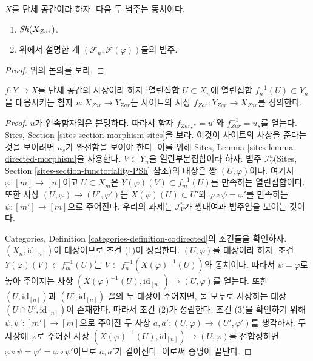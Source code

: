 \begin{lemma}
\label{lemma-describe-sheaves-simplicial-site}
$X$를 단체 공간이라 하자. 다음 두 범주는 동치이다.
\begin{enumerate}
\item $\mathop{\mathit{Sh}}\nolimits(X_{Zar})$.
\item 위에서 설명한 계 $(\mathcal{F}_n, \mathcal{F}(\varphi))$들의 범주.
\end{enumerate}
\end{lemma}


\begin{proof}
위의 논의를 보라.
\end{proof}

\begin{lemma}
\label{lemma-simplicial-space-site-functorial}
$f : Y \to X$를 단체 공간의 사상이라 하자.
열린집합 $U \subset X_n$에 열린집합
$f_n^{-1}(U) \subset Y_n$을 대응시키는 함자 $u : X_{Zar} \to Y_{Zar}$는
사이트의 사상 $f_{Zar} : Y_{Zar} \to X_{Zar}$를 정의한다.
\end{lemma}

\begin{proof}
$u$가 연속함자임은 분명하다. 따라서 함자
$f_{Zar, *} = u^s$와 $f_{Zar}^{-1} = u_s$를 얻는다.
Sites, Section \ref{sites-section-morphism-sites}을 보라.
이것이 사이트의 사상을 준다는 것을 보이려면 $u_s$가 완전함을
보여야 한다. 이를 위해 Sites, Lemma
\ref{sites-lemma-directed-morphism}을 사용한다.
$V \subset Y_n$을 열린부분집합이라 하자. 범주
$\mathcal{I}_V^u$(Sites, Section \ref{sites-section-functoriality-PSh} 참조)의
대상은 쌍 $(U, \varphi)$이다. 여기서
$\varphi : [m] \to [n]$이고 $U \subset X_m$은
$Y(\varphi)(V) \subset f_m^{-1}(U)$를 만족하는 열린집합이다.
또한 사상 $(U, \varphi) \to (U', \varphi')$는
$X(\psi)(U) \subset U'$와 $\varphi \circ \psi = \varphi'$를 만족하는
$\psi : [m'] \to [m]$으로 주어진다.
우리의 과제는 $\mathcal{I}_V^u$가 쌍대여과 범주임을 보이는 것이다.

\medskip\noindent
Categories, Definition \ref{categories-definition-codirected}의 조건들을
확인하자. $(X_n, \text{id}_{[n]})$이 대상이므로 조건 (1)이 성립한다.
$(U, \varphi)$를 대상이라 하자. 조건
$Y(\varphi)(V) \subset f_m^{-1}(U)$는
$V \subset f_n^{-1}(X(\varphi)^{-1}(U))$와 동치이다. 따라서
$\psi = \varphi$로 놓아 주어지는 사상
$(X(\varphi)^{-1}(U), \text{id}_{[n]}) \to (U, \varphi)$를 얻는다.
또한 $(U, \text{id}_{[n]})$과 $(U', \text{id}_{[n]})$ 꼴의
두 대상이 주어지면, 둘 모두로 사상하는 대상
$(U \cap U', \text{id}_{[n]})$이 존재한다. 따라서 조건 (2)가 성립한다.
조건 (3)을 확인하기 위해 $\psi, \psi' : [m'] \to [m]$으로 주어진
두 사상 $a, a': (U, \varphi) \to (U', \varphi')$를 생각하자.
두 사상에 $\varphi$로 주어진 사상
$(X(\varphi)^{-1}(U), \text{id}_{[n]}) \to (U, \varphi)$를 전합성하면
$\varphi \circ \psi = \varphi' = \varphi \circ \psi'$이므로
$a, a'$가 같아진다.
이로써 증명이 끝난다.
\end{proof}

